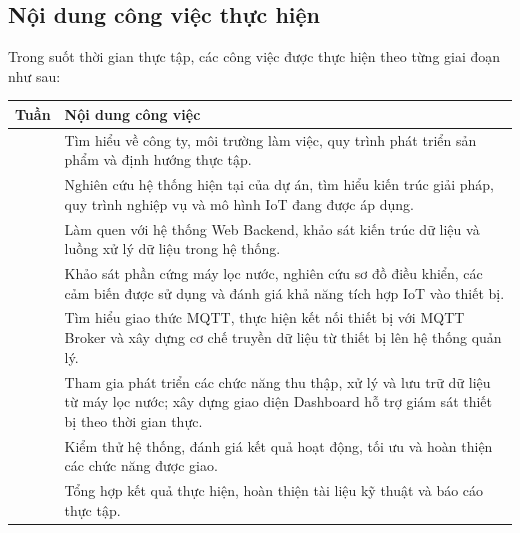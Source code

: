 \subsection{Nội dung công việc thực hiện}

Trong suốt thời gian thực tập, các công việc được thực hiện theo từng giai đoạn như sau:

\begin{table}[htbp]
    \centering
    \begin{tabularx}{\textwidth}{|>{\centering\arraybackslash}p{2cm}|X|}
        \hline
        \textbf{Tuần} & \textbf{Nội dung công việc} \\
        \hline
        1 & Tìm hiểu về công ty, môi trường làm việc, quy trình phát triển sản phẩm và định hướng thực tập. \\
        \hline
        2 & Nghiên cứu hệ thống hiện tại của dự án, tìm hiểu kiến trúc giải pháp, quy trình nghiệp vụ và mô hình IoT đang được áp dụng. \\
        \hline
        3 & Làm quen với hệ thống Web Backend, khảo sát kiến trúc dữ liệu và luồng xử lý dữ liệu trong hệ thống. \\
        \hline
        4 & Khảo sát phần cứng máy lọc nước, nghiên cứu sơ đồ điều khiển, các cảm biến được sử dụng và đánh giá khả năng tích hợp IoT vào thiết bị. \\
        \hline
        5 & Tìm hiểu giao thức MQTT, thực hiện kết nối thiết bị với MQTT Broker và xây dựng cơ chế truyền dữ liệu từ thiết bị lên hệ thống quản lý. \\
        \hline
        6 & Tham gia phát triển các chức năng thu thập, xử lý và lưu trữ dữ liệu từ máy lọc nước; xây dựng giao diện Dashboard hỗ trợ giám sát thiết bị theo thời gian thực. \\
        \hline
        7 & Kiểm thử hệ thống, đánh giá kết quả hoạt động, tối ưu và hoàn thiện các chức năng được giao. \\
        \hline
        8 & Tổng hợp kết quả thực hiện, hoàn thiện tài liệu kỹ thuật và báo cáo thực tập. \\
        \hline
    \end{tabularx}
\end{table}